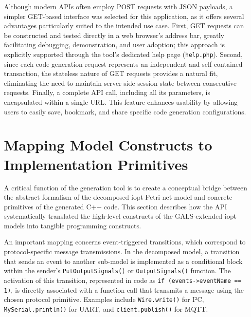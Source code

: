 Although modern APIs often employ POST requests with JSON payloads, a simpler GET-based interface was selected for this application, as it offers several advantages particularly suited to the intended use case. First, GET requests can be constructed and tested directly in a web browser's address bar, greatly facilitating debugging, demonstration, and user adoption; this approach is explicitly supported through the tool’s dedicated help page (\texttt{help.php}). Second, since each code generation request represents an independent and self-contained transaction, the stateless nature of GET requests provides a natural fit, eliminating the need to maintain server-side session state between consecutive requests. Finally, a complete API call, including all its parameters, is encapsulated within a single URL. This feature enhances usability by allowing users to easily save, bookmark, and share specific code generation configurations.




\section{Mapping Model Constructs to Implementation Primitives}
\label{sec:mapping_constructs}

A critical function of the generation tool is to create a conceptual bridge between the abstract formalism of the decomposed \gls{iopt} Petri net model and concrete primitives of the generated C++ code. This section describes how the API systematically translated the high-level constructs of the GALS-extended \gls{iopt} models into tangible programming constructs.

An important mapping concerns event-triggered transitions, which correspond to protocol-specific message transmissions. In the decomposed model, a transition that sends an event to another sub-model is implemented as a conditional block within the sender's \texttt{PutOutputSignals()} or \texttt{OutputSignals()} function. The activation of this transition, represented in code as \texttt{if (events->eventName == 1)}, is directly associated with a function call that transmits a message using the chosen protocol primitive. Examples include \texttt{Wire.write()} for I²C, \texttt{MySerial.println()} for UART, and \texttt{client.publish()} for MQTT.

